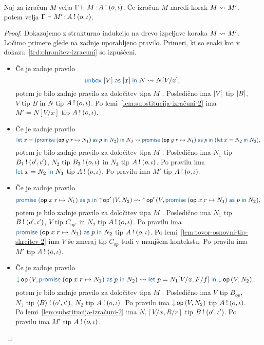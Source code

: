 

\begin{trditev}[o ohranitvi]\label{trd:ohranitev-izracuni-2}
	Naj za izračun $M$ velja $\Gamma \vdash M \mathinner{:} A \mathbin{!} (o, \iota)$. Če izračun $M$ naredi korak $M \leadsto M'$, potem velja $\Gamma \vdash M' \mathinner{:} A \mathbin{!} (o, \iota)$.
\end{trditev}

\begin{proof}
	Dokazujemo z strukturno indukcijo na drevo izpeljave koraka $M \leadsto M'$.
	Ločimo primere glede na zadnje uporabljeno pravilo.
	Primeri, ki so enaki kot v dokazu~\ref{trd:ohranitev-izracuni} so izpuščeni.
	
	\begin{itemize}
		\item Če je zadnje pravilo $$\tmunbox{[V]}{x}{N} \reduces N[V/x],$$ potem je bilo zadnje pravilo za določitev tipa $M$ . Posledično ima $[V]$ tip $[B]$, $V$ tip $B$ in $N$ tip $A \mathbin{!} (o, \iota)$. Po lemi~\ref{lem:substitucija-izračuni-2} ima $M' = N[V/x]$ tip $A \mathbin{!} (o, \iota)$.
		
		\item Če je zadnje pravilo $$\tmlet{x}{(\tmwithrec{op}{y}{r}{N_1}{p}{N_2})}{N_3} \reduces \tmwithrec{op}{y}{r}{N_1}{p}{(\tmlet{x}{N_2}{N_3})},$$ potem je bilo zadnje pravilo za določitev tipa $M$ .
		Posledično ima $N_1$ tip $B_1 \mathbin{!} (o', \iota')$, $N_2$ tip $B_2 \mathbin{!} (o, \iota)$ in $N_3$ tip $A \mathbin{!} (o, \iota)$.
		Po pravilu  ima $\tmlet{x}{N_2}{N_3}$ tip $A \mathbin{!} (o, \iota)$.
		Po pravilu  ima $M'$ tip $A \mathbin{!} (o, \iota)$.
		
		\item Če je zadnje pravilo $$\tmwithrec{op}{x}{r}{N_1}{p}{\tmopout{op'}{V}{N_2}} \reduces \tmopout{op'}{V}{\tmwithrec{op}{x}{r}{N_1}{p}{N_2}},$$ potem je bilo zadnje pravilo za določitev tipa $M$ .
		Posledično ima  $N_1$ tip $B \mathbin{!} (o', \iota')$, $V$ tip $C_{op'}$ in $N_2$ tip $A \mathbin{!} (o, \iota)$.
		Po pravilu  ima $\tmwithrec{op}{x}{r}{N_1}{p}{N_2}$ tip $A \mathbin{!} (o, \iota)$.
		Po lemi~\ref{lem:tovor-osnovni-tip-skrcitev-2} ima $V$ še zmeraj tip $C_{op}$ tudi v manjšem kontekstu.
		Po pravilu  ima $M'$ tip $A \mathbin{!} (o, \iota)$.
		
		\item Če je zadnje pravilo $$\tmopin{op}{V}{\tmwithrec{op}{x}{r}{N_1}{p}{N_2}} \reduces \tmlet{p}{N_1[V/x, F/f]}{\tmopin{op}{V}{N_2}},$$ potem je bilo zadnje pravilo za določitev tipa $M$ .
		Posledično ima $V$ tip $B_{op}$, $N_1$ tip $\langle B \rangle \mathbin{!} (o', \iota')$, $N_2$ tip $A \mathbin{!} (o, \iota)$.
		Po pravilu  ima $\tmopin{op}{V}{N_2}$ tip $A \mathbin{!} (o, \iota)$.
		Po lemi~\ref{lem:substitucija-izračuni-2} ima $N_1[V/x, R/r]$ tip $B \mathbin{!} (o', \iota')$.
		Po pravilu  ima $M'$ tip $A \mathbin{!} (o, \iota)$.
		

\end{itemize}
\end{proof}
